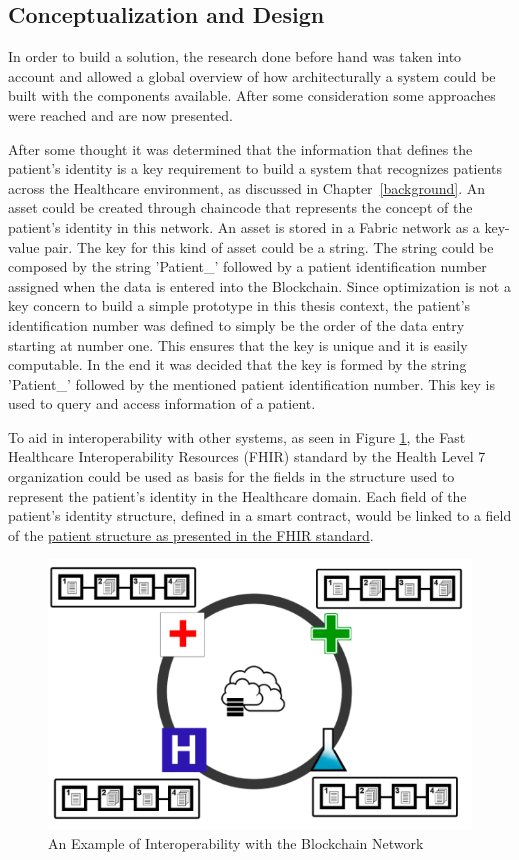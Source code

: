 \subsection{Conceptualization and Design}

In order to build a solution, the research done before hand was taken into
account and allowed a global overview of how architecturally a system could be
built with the components available. After some consideration some approaches
were reached and are now presented.

After some thought it was determined that the information that defines the
patient's identity is a key requirement to build a system that recognizes
patients across the Healthcare environment, as discussed in
Chapter~\ref{background}. An asset could be created through chaincode that
represents the concept of the patient's identity in this network. An asset is
stored in a Fabric network as a key-value pair. The key for this kind of asset
could be a string. The string could be composed by the string 'Patient\_'
followed by a patient identification number assigned when the data is entered
into the Blockchain. Since optimization is not a key concern to build a simple
prototype in this thesis context, the patient's identification number was
defined to simply be the order of the data entry starting at number one. This
ensures that the key is unique and it is easily computable. In the end it was
decided that the key is formed by the string 'Patient\_' followed by the
mentioned patient identification number. This key is used to query and access
information of a patient.

To aid in interoperability with other systems, as seen in Figure
\ref{fig:interoperability}, the Fast Healthcare Interoperability Resources
(FHIR) standard by the Health Level 7 organization could be used as basis for
the fields in the structure used to represent the patient's identity in the
Healthcare domain.  Each field of the patient's identity structure, defined in
a smart contract, would be linked to a field of the
\href{http://www.hl7.org/fhir/patient.html}{patient structure as presented in
the FHIR standard}.

\begin{figure}[ht] \centering
  \includegraphics[width=0.7\linewidth]{imgs/interoperability.png}
  \caption{\label{fig:interoperability}An Example of Interoperability with the
  Blockchain Network} 
\end{figure}


